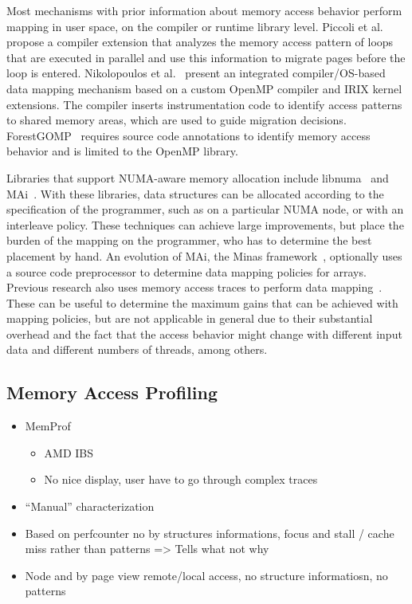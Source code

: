 Most mechanisms with prior information about memory access behavior perform mapping in user space, on the compiler or runtime library level.
Piccoli et al.~\cite{Piccoli2014} propose a compiler extension that analyzes the memory access pattern of loops that are executed in parallel and use this information to migrate pages before the loop is entered.
Nikolopoulos et al.~\cite{Nikolopoulos2000a,Nikolopoulos2000} present an integrated compiler/OS-based data mapping mechanism based on a custom OpenMP compiler and IRIX kernel extensions. The compiler inserts instrumentation code to identify access patterns to shared memory areas, which are used to guide migration decisions.
ForestGOMP~\cite{Broquedis2010a} requires source code annotations to identify memory access behavior and is limited to the OpenMP library.

Libraries that support NUMA-aware memory allocation include libnuma~\cite{Kleen2004} and MAi~\cite{Ribeiro2009}. With these libraries, data structures can be allocated according to the specification of the programmer, such as on a particular NUMA node, or with an interleave policy. These techniques can achieve large improvements, but place the burden of the mapping on the programmer, who has to determine the best placement by hand. An evolution of MAi, the Minas framework~\cite{Ribeiro2010}, optionally uses a source code preprocessor to determine data mapping policies for arrays. Previous research also uses memory access traces to perform data mapping~\cite{Diener2015,Marathe2010,Bolosky1992}. These can be useful to determine the maximum gains that can be achieved with mapping policies, but are not applicable in general due to their substantial overhead and the fact that the access behavior might change with different input data and different numbers of threads, among others.


\subsection{Memory Access Profiling}
\label{sec:soa-profiling}

\begin{itemize}
    \item MemProf \cite{Lachaize12MemProf}
        \begin{itemize}
            \item AMD IBS
            \item No nice display, user have to go through complex traces
        \end{itemize}
    \item ``Manual'' characterization \cite{Majo13(Mis)understanding,Jiang14Understanding}

    \item Based on perfcounter no by structures informations, focus and stall
        / cache miss rather than patterns \cite{Bosch00Rivet, Weyers14Visualization}
        => Tells what not why
    \item Node and by page view remote/local access, no structure informatiosn,
        no patterns \cite{Tao01Visualizing}
\end{itemize}


